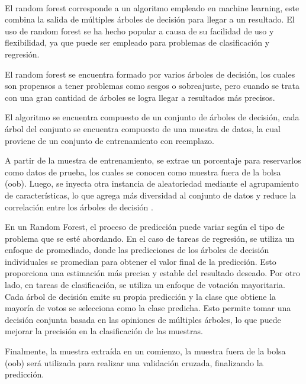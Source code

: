 \\
El random forest corresponde a un algoritmo empleado en machine learning, este combina la salida de múltiples árboles de decisión para llegar a un resultado. El uso de random forest se ha hecho popular a causa de su facilidad de uso y flexibilidad, ya que puede ser empleado para problemas de clasificación y regresión.

El random forest se encuentra formado por varios árboles de decisión, los cuales son propensos a tener problemas como sesgos o sobreajuste, pero cuando se trata con una gran cantidad de árboles se logra llegar a resultados más precisos.

El algoritmo se encuentra compuesto de un conjunto de árboles de decisión, cada árbol del conjunto se encuentra compuesto de una muestra de datos, la cual proviene de un conjunto de entrenamiento con reemplazo.

A partir de la muestra de entrenamiento, se extrae un porcentaje para reservarlos como datos de prueba, los cuales se conocen como muestra fuera de la bolsa (oob). Luego, se inyecta otra instancia de aleatoriedad mediante el agrupamiento de características, lo que agrega más diversidad al conjunto de datos y reduce la correlación entre los árboles de decisión \cite{random-forest}.

En un Random Forest, el proceso de predicción puede variar según el tipo de problema que se esté abordando. En el caso de tareas de regresión, se utiliza un enfoque de promediado, donde las predicciones de los árboles de decisión individuales se promedian para obtener el valor final de la predicción. Esto proporciona una estimación más precisa y estable del resultado deseado. Por otro lado, en tareas de clasificación, se utiliza un enfoque de votación mayoritaria. Cada árbol de decisión emite su propia predicción y la clase que obtiene la mayoría de votos se selecciona como la clase predicha. Esto permite tomar una decisión conjunta basada en las opiniones de múltiples árboles, lo que puede mejorar la precisión en la clasificación de las muestras.

Finalmente, la muestra extraída en un comienzo, la muestra fuera de la bolsa (oob) será utilizada para realizar una validación cruzada, finalizando la predicción.

